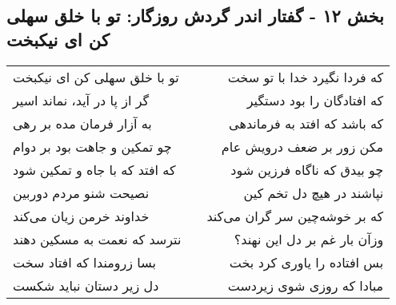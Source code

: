 \begin{center}
\section*{بخش ۱۲ - گفتار اندر گردش روزگار: تو با خلق سهلی کن ای نیکبخت}
\label{sec:012}
\begin{longtable}{l p{0.5cm} r}
تو با خلق سهلی کن ای نیکبخت
&&
که فردا نگیرد خدا با تو سخت
\\
گر از پا در آید، نماند اسیر
&&
که افتادگان را بود دستگیر
\\
به آزار فرمان مده بر رهی
&&
که باشد که افتد به فرماندهی
\\
چو تمکین و جاهت بود بر دوام
&&
مکن زور بر ضعف درویش عام
\\
که افتد که با جاه و تمکین شود
&&
چو بیدق که ناگاه فرزین شود
\\
نصیحت شنو مردم دوربین
&&
نپاشند در هیچ دل تخم کین
\\
خداوند خرمن زیان می‌کند
&&
که بر خوشه‌چین سر گران می‌کند
\\
نترسد که نعمت به مسکین دهند
&&
وزآن بار غم بر دل این نهند؟
\\
بسا زرومندا که افتاد سخت
&&
بس افتاده را یاوری کرد بخت
\\
دل زیر دستان نباید شکست
&&
مبادا که روزی شوی زیردست
\\
\end{longtable}
\end{center}
